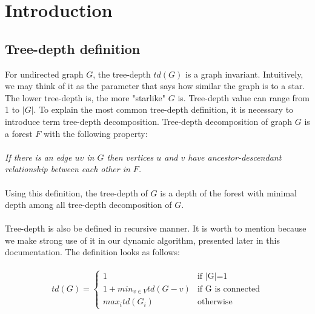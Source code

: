 \section{Introduction}
\subsection{Tree-depth definition}
For undirected graph $G$, the tree-depth $td(G)$ is a graph invariant. Intuitively, we may think of it as the parameter that says how similar the graph is to a star. The lower tree-depth is, the more "starlike" $G$ is.
Tree-depth value can range from 1 to $|G|$.
To explain the most common tree-depth definition, it is necessary to introduce term tree-depth decomposition. Tree-depth decomposition of graph $G$ is a forest $F$ with the following property:\\\\
\emph{If there is an edge $uv$ in $G$ then vertices $u$ and $v$ have ancestor-descendant relationship between each other in $F$.}\\\\
Using this definition, the tree-depth of $G$ is a depth of the forest with minimal depth among all tree-depth decomposition of $G$.\\\\
Tree-depth is also be defined in recursive manner. It is worth to mention because we make strong use of it in our dynamic algorithm, presented later in this documentation. The definition looks as follows:\\\\
\begin{equation}
td(G) =
\begin{cases}
1 & \text{if $|$G$|$=1}\\
1+min_{v \in V} td(G-v) & \text{if G is connected}\\
max_{i} td(G_{i})  & \text{otherwise}
\end{cases}       
\end{equation}
\\\\
